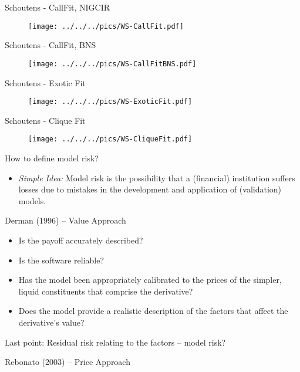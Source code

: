 {Schoutens - CallFit, NIGCIR}
\begin{figure}[htp]
\centering
\texttt{[image: ../../../pics/WS-CallFit.pdf]}
\end{figure}



{Schoutens - CallFit, BNS}
\begin{figure}[htp]
\centering
\texttt{[image: ../../../pics/WS-CallFitBNS.pdf]}
\end{figure}



{Schoutens - Exotic Fit}
\begin{figure}[htp]
\centering
\texttt{[image: ../../../pics/WS-ExoticFit.pdf]}
\end{figure}



{Schoutens - Clique Fit}
\begin{figure}[htp]
\centering
\texttt{[image: ../../../pics/WS-CliqueFit.pdf]}
\end{figure}




{How to define model risk?}
\begin{itemize}
\item {\it Simple Idea:} Model risk is the possibility that a (financial) institution suffers losses due to mistakes in the development and application of (validation) models.
\end{itemize}




{Derman (1996) -- Value Approach}
\begin{itemize}
\item Is the payoff accurately described?
\item Is the software reliable?
\item Has the model been appropriately calibrated to the prices of the simpler, liquid constituents that comprise the derivative?
\item Does the model provide a realistic description of the factors that affect the derivative's value?
\end{itemize}
Last point: Residual risk relating to the factors -- model risk?




{Rebonato (2003) -- Price Approach}

